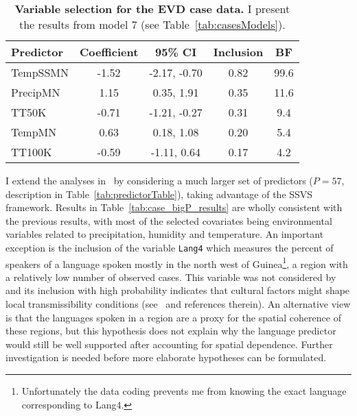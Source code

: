\begin{minipage}{\textwidth}    
\setcounter{mpfootnote}{\value{footnote}}
\renewcommand{\thempfootnote}{\arabic{mpfootnote}}
\fontsize{9}{11}\selectfont
{}
\begin{longtable}{lcccc}
\caption[Variable selection for the EVD case data.]{\textbf{Variable selection for the EVD case data.}
I present the results from model 7 (see Table~\ref{tab:casesModels}).
}
\label{tab:case_glm_results}\\
\toprule
Predictor\footnotemark[1] & Coefficient\footnotemark[2] & 95\% CI\footnotemark[3] & Inclusion\footnotemark[4] & BF\footnotemark[5] \\
\toprule
TempSSMN & -1.52 & -2.17, -0.70 & 0.82 & 99.6 \\
\hline
PrecipMN & 1.15 & 0.35, 1.91 & 0.35 & 11.6 \\
\hline
TT50K &  -0.71 & -1.21, -0.27 & 0.31 & 9.4 \\
\hline
TempMN &  0.63 & 0.18, 1.08 & 0.20 & 5.4 \\
\hline
TT100K & -0.59 & -1.11, 0.64 & 0.17 & 4.2\\
\bottomrule
\end{longtable}
\setcounter{footnote}{\value{mpfootnote}}
\end{minipage}

I extend the analyses in~\cite{Dudas2017} by considering a much larger set of predictors ($P = 57$, description in Table~\ref{tab:predictorTable}), taking advantage of the SSVS framework.
Results in Table~\ref{tab:case_bigP_results} are wholly consistent with the previous results, with most of the selected covariates being environmental variables related to precipitation, humidity and temperature.
An important exception is the inclusion of the variable \verb|Lang4| which measures the percent of speakers of a language spoken mostly in the north west of Guinea\footnote{Unfortunately the data coding prevents me from knowing the exact language corresponding to  Lang4.}, a region with a relatively low number of observed cases.
This variable was not considered by~\cite{Dudas2017} and its inclusion with high probability indicates that cultural factors might shape local transmissibility conditions (see~\cite{Alexander2015} and references therein).
An alternative view is that the languages spoken in a region are a proxy for the spatial coherence of these regions, but this hypothesis does not explain why the language predictor would still be well supported after accounting for spatial dependence.
Further investigation is needed before more elaborate hypotheses can be formulated.


